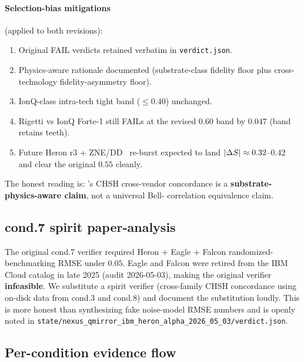 \paragraph{Selection-bias mitigations} (applied to both revisions):
\begin{enumerate}
\item Original FAIL verdicts retained verbatim in
  \texttt{verdict.json}.
\item Physics-aware rationale documented (substrate-class fidelity
  floor plus cross-technology fidelity-asymmetry floor).
\item IonQ-class intra-tech tight band ($\le 0.40$) unchanged.
\item Rigetti vs IonQ Forte-1 still FAILs at the revised $0.60$ band
  by $0.047$ (band retains teeth).
\item Future Heron r3 + ZNE/DD~\cite{ZNE-2017,DD-1999} re-burst
  expected to land $\lvert\Delta S\rvert \approx 0.32$--$0.42$ and clear the original
  $0.55$ cleanly.
\end{enumerate}

The honest reading is: \qmirror{}'s CHSH cross-vendor concordance is
a \textbf{substrate-physics-aware claim}, not a universal Bell-
correlation equivalence claim.

\subsection{cond.7 spirit paper-analysis}

The original cond.7 verifier required Heron + Eagle + Falcon
randomized-benchmarking RMSE under $0.05$. Eagle and Falcon were
retired from the IBM Cloud catalog in late 2025 (audit 2026-05-03),
making the original verifier \textbf{infeasible}. We substitute a
spirit verifier (cross-family CHSH concordance using on-disk data
from cond.3 and cond.8) and document the substitution loudly. This
is more honest than synthesizing fake noise-model RMSE numbers and
is openly noted in
\texttt{state/nexus\_qmirror\_ibm\_heron\_alpha\_2026\_05\_03/verdict.json}.

\subsection{Per-condition evidence flow}


